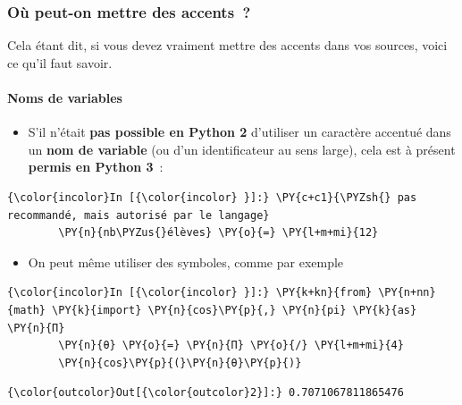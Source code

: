     \hypertarget{ouxf9-peut-on-mettre-des-accents}{%
\subsubsection{Où peut-on mettre des
accents~?}\label{ouxf9-peut-on-mettre-des-accents}}

    Cela étant dit, si vous devez vraiment mettre des accents dans vos
sources, voici ce qu'il faut savoir.

    \hypertarget{noms-de-variables}{%
\paragraph{Noms de variables}\label{noms-de-variables}}

    \begin{itemize}
\tightlist
\item
  S'il n'était \textbf{pas possible en Python 2} d'utiliser un caractère
  accentué dans un \textbf{nom de variable} (ou d'un identificateur au
  sens large), cela est à présent \textbf{permis en Python 3}~:
\end{itemize}

    \begin{Verbatim}[commandchars=\\\{\}]
{\color{incolor}In [{\color{incolor} }]:} \PY{c+c1}{\PYZsh{} pas recommandé, mais autorisé par le langage}
        \PY{n}{nb\PYZus{}élèves} \PY{o}{=} \PY{l+m+mi}{12}
\end{Verbatim}


    \begin{itemize}
\tightlist
\item
  On peut même utiliser des symboles, comme par exemple
\end{itemize}

    \begin{Verbatim}[commandchars=\\\{\}]
{\color{incolor}In [{\color{incolor} }]:} \PY{k+kn}{from} \PY{n+nn}{math} \PY{k}{import} \PY{n}{cos}\PY{p}{,} \PY{n}{pi} \PY{k}{as} \PY{n}{Π}
        \PY{n}{θ} \PY{o}{=} \PY{n}{Π} \PY{o}{/} \PY{l+m+mi}{4}
        \PY{n}{cos}\PY{p}{(}\PY{n}{θ}\PY{p}{)}
\end{Verbatim}

\begin{Verbatim}[commandchars=\\\{\}]
{\color{outcolor}Out[{\color{outcolor}2}]:} 0.7071067811865476
\end{Verbatim}

